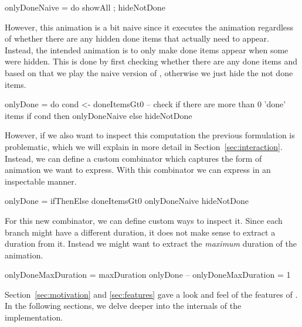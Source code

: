 \begin{spec}
onlyDoneNaive = do showAll ; hideNotDone
\end{spec}

However, this animation is a bit naive since it executes the  animation regardless of whether there are any hidden done items that actually need to appear. Instead, the intended animation is to only make done items appear when some were hidden. This is done by first checking whether there are any done items and based on that we play the naive version of , otherwise we just hide the not done items.

\begin{spec}
onlyDone = do
  cond <- doneItemsGt0 -- check if there are more than 0 'done' items
  if cond then onlyDoneNaive else hideNotDone
\end{spec}

However, if we also want to inspect this computation the previous formulation is problematic, which we will explain in more detail in Section~\ref{sec:interaction}. Instead, we can define a custom combinator  which captures the form of animation we want to express. With this combinator we can express  in an inspectable manner.

\begin{spec}
onlyDone = ifThenElse doneItemsGt0 onlyDoneNaive hideNotDone
\end{spec}

For this new combinator, we can define custom ways to inspect it. Since each branch might have a different duration, it does not make sense to extract a duration from it. Instead we might want to extract the \emph{maximum} duration of the animation.

\begin{spec}
onlyDoneMaxDuration = maxDuration onlyDone
-- onlyDoneMaxDuration = 1
\end{spec}

Section~\ref{sec:motivation} and \ref{sec:features} gave a look and feel of the features of \dsl{}. In the following sections, we delve deeper into the internals of the implementation.
